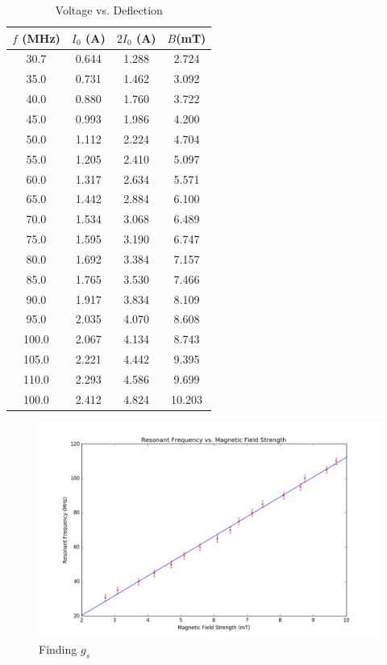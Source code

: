 \documentclass{amsart}
\begin{document}
\begin{table}[H]
    \centering
    \caption{Voltage vs. Deflection}
    \label{table:deflection}
    \begin{tabular}{c|c|c|c}
        $f$ (MHz)&$I_0$ (A) &$2I_0$ (A) &$B$(mT) \\ \hline
        30.7     & 0.644    & 1.288     & 2.724  \\
        35.0     & 0.731    & 1.462     & 3.092  \\
        40.0     & 0.880    & 1.760     & 3.722  \\
        45.0     & 0.993    & 1.986     & 4.200  \\
        50.0     & 1.112    & 2.224     & 4.704  \\
        55.0     & 1.205    & 2.410     & 5.097  \\
        60.0     & 1.317    & 2.634     & 5.571  \\
        65.0     & 1.442    & 2.884     & 6.100  \\
        70.0     & 1.534    & 3.068     & 6.489  \\
        75.0     & 1.595    & 3.190     & 6.747  \\
        80.0     & 1.692    & 3.384     & 7.157  \\
        85.0     & 1.765    & 3.530     & 7.466  \\
        90.0     & 1.917    & 3.834     & 8.109  \\
        95.0     & 2.035    & 4.070     & 8.608  \\
        100.0    & 2.067    & 4.134     & 8.743  \\
        105.0    & 2.221    & 4.442     & 9.395  \\
        110.0    & 2.293    & 4.586     & 9.699  \\
        100.0    & 2.412    & 4.824     & 10.203
    \end{tabular}
\end{table}

\begin{figure}[h]
    \centering
    \includegraphics[width=\textwidth]{fitted.png}
    \caption{Finding $g_s$}
\end{figure}
\end{document}
